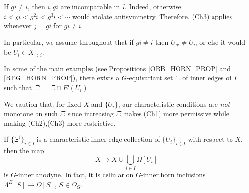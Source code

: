\documentclass[a4paper,10pt,draft]{article}%
\begin{document}
\begin{remark}\label{XIIII REM}
If $g i \neq i$, then $i,g i$ are incomparable in $I$. Indeed, otherwise $i<gi<g^2i<g^3i<\cdots$ would violate antisymmetry.
Therefore, (Ch3) applies whenever $j=gi$ for $gi\neq i$.

In particular, we assume throughout that if
$gi \neq i$ then $U_{gi} \neq U_i$,
or else it would be $U_i \in X_{<i}$.
\end{remark}


\begin{remark}\label{SOMEMAIN REM}
In some of the main examples (see Propositions \ref{ORB_HORN_PROP} and \ref{REG_HORN_PROP}), there exists a $G$-equivariant set 
$\Xi$ of inner edges of $T$ such that $\Xi^i = \Xi \cap E^{\mathsf{i}}(U_i)$.

	
We caution that, for fixed $X$ and $\{U_i\}$, our characteristic conditions are \textit{not} monotone on such $\Xi$ since increasing $\Xi$ makes (Ch1) more permissive while making (Ch2),(Ch3) more restrictive.
\end{remark}


\begin{lemma}\label{CHAREDGE LEM}
If $\{\Xi^i\}_{i \in I}$ is a characteristic inner edge collection of $\{U_i\}_{i\in I}$ with respect to $X$, then the map
	\begin{equation}\label{CHARLEM EQ}
		X \to X \cup \bigcup_{i \in I} \Omega[U_i]
	\end{equation}
is $G$-inner anodyne. In fact, it is cellular on $G$-inner horn inclusions $\Lambda^E[S] \to \Omega[S]$, $S \in \Omega_G$.
\end{lemma}
\end{document}
